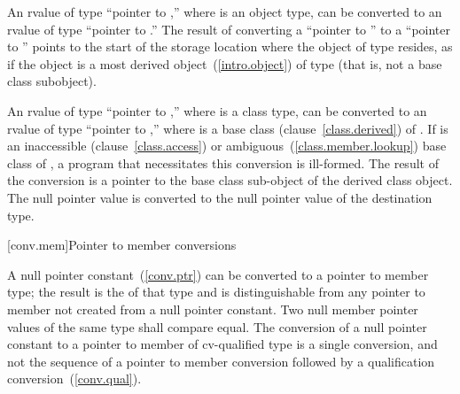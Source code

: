 \pnum
An rvalue of type ``pointer to  ,'' where 
is an object type, can be converted to an rvalue of type ``pointer to
 .'' The result of converting a ``pointer to
 '' to a ``pointer to  ''
points to the start of the storage location where the object of type
 resides, as if the object is a most derived
object~(\ref{intro.object}) of type  (that is, not a base class
subobject).

\pnum
An rvalue of type ``pointer to  ,'' where 
is a class type, can be converted to an rvalue of type ``pointer to
 ,'' where  is a base class
(clause~\ref{class.derived}) of . If  is an
inaccessible (clause~\ref{class.access}) or
ambiguous~(\ref{class.member.lookup}) base class of , a program
that necessitates this conversion is ill-formed. The result of the
conversion is a pointer to the base class sub-object of the derived class
object. The null pointer value is converted to the null pointer value of
the destination type.

[conv.mem]{Pointer to member conversions}

\pnum
{}%
%
%
A null pointer constant~(\ref{conv.ptr}) can be converted to a pointer
to member type; the result is the 
of that type and is distinguishable from any pointer to member not
created from a null pointer constant. Two null member pointer values of
the same type shall compare equal. The conversion of a null pointer
constant to a pointer to member of cv-qualified type is a single
conversion, and not the sequence of a pointer to member conversion
followed by a qualification conversion~(\ref{conv.qual}).

